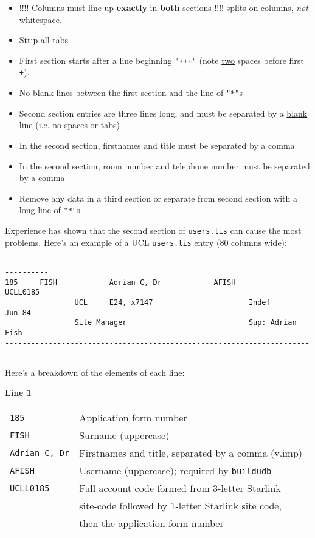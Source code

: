 \begin{itemize}
\item !!!! Columns must line up {\bf exactly} in {\bf both} sections !!!! 
       splits on columns, {\it not} whitespace.
\item Strip all tabs
\item First section starts after a line beginning {\tt "\hspace{2em}+++"} (note 
      \underline{two} spaces before first {\tt +}).
\item No blank lines between the first section and the line of {\tt"*"}s
\item Second section entries are three lines long, and must be separated by
      a \underline{blank} line (i.e. no spaces or tabs)
\item In the second section, firstnames and title must be separated by a
      comma
\item In the second section, room number and telephone number must be 
      separated by a comma
\item Remove any data in a third section or separate from second section
      with a long line of {\tt "*"}s.
\end{itemize}


Experience has shown that the second section of {\tt users.lis} can cause
the most problems. Here's an example of a UCL {\tt users.lis} entry (80
columns wide): 

\begin{small}
\begin{verbatim}
--------------------------------------------------------------------------------
185     FISH            Adrian C, Dr            AFISH                   UCLL0185
                UCL     E24, x7147                      Indef             Jun 84
                Site Manager                            Sup: Adrian Fish
--------------------------------------------------------------------------------
\end{verbatim}
\end{small}

Here's a breakdown of the elements of each line:

{\bf Line 1}

\begin{center}
\begin{tabular}{ll}
{\tt 185}          & Application form number\\
{\tt FISH}         & Surname (uppercase)\\
{\tt Adrian C, Dr} & Firstnames and title, separated by a comma (v.imp)\\
{\tt AFISH}        & Username (uppercase); required by {\tt buildudb}\\
{\tt UCLL0185}     & Full account code formed from 3-letter Starlink \\
                   & site-code followed by 1-letter Starlink site code, \\
                   & then the application form number \\
\end{tabular}
\end{center}

